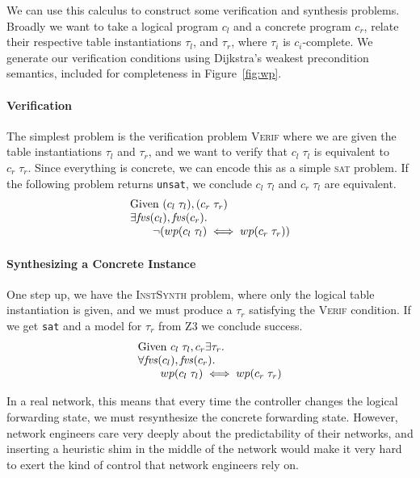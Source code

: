 We can use this calculus to construct some verification and synthesis
problems. Broadly we want to take a logical program $c_l$ and a concrete program
$c_r$, relate their respective table instantiations $\tau_l$, and $\tau_r$,
where $\tau_i$ is $c_i$-complete.  We generate our verification conditions using
Dijkstra's weakest precondition semantics, included for completeness in
Figure~\ref{fig:wp}.

\paragraph{Verification} The simplest problem is the verification problem
\textsc{Verif} where we are given the table instantiations $\tau_l$ and
$\tau_r$, and we want to verify that $c_l\; \tau_l$ is equivalent to
$c_r\; \tau_r$. Since everything is concrete, we can encode this as a simple
\textsc{sat} problem. If the following problem returns \texttt{unsat}, we
conclude $c_l\; \tau_l$ and $c_r\; \tau_l$ are equivalent.
\[\begin{array}{lcl}
    \text{Given }( c_l\; \tau_l), (c_r\; \tau_r) \\
    \exists \mathit{fvs}(c_l), \mathit{fvs}(c_r). \\
    \qquad \neg(wp(c_l\; \tau_l) \iff wp(c_r\; \tau_r))
  \end{array}
\]

\paragraph{Synthesizing a Concrete Instance} One step up, we have the
\textsc{InstSynth} problem, where only the logical table instantiation is given,
and we must produce a $\tau_r$ satisfying the \textsc{Verif} condition. If we
get \texttt{sat} and a model for $\tau_r$ from Z3 we conclude success.
\[\begin{array}{lcl}
    \text{Given } c_l\; \tau_l,c_r
    \exists \tau_r.\\
    \forall \mathit{fvs}(c_l), \mathit{fvs}(c_r). \\
    \qquad wp(c_l\; \tau_l) \iff wp(c_r\; \tau_r)
  \end{array}
\]

In a real network, this means that every time the
controller changes the logical forwarding state, we must resynthesize the
concrete forwarding state. However, network engineers care very deeply about the
predictability of their networks, and inserting a heuristic shim in the middle
of the network would make it very hard to exert the kind of control that network
engineers rely on.

